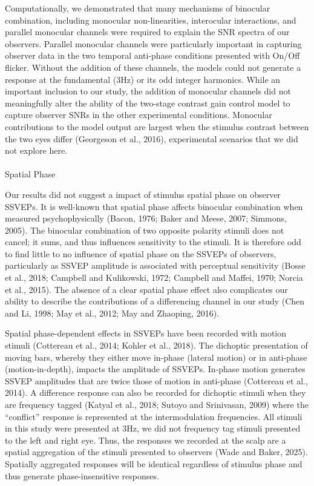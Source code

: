\documentclass[
  12pt,
]{article}
\makeatletter
\let\oldparagraph\paragraph
\renewcommand{\paragraph}{
    \@ifstar
      \xxxParagraphStar
      \xxxParagraphNoStar
  }
\newcommand{\xxxParagraphStar}[1]{\oldparagraph*{#1}\mbox{}}
\newcommand{\xxxParagraphNoStar}[1]{\oldparagraph{#1}\mbox{}}
\makeatother
\begin{document}
Computationally, we demonstrated that many mechanisms of binocular
combination, including monocular non-linearities, interocular
interactions, and parallel monocular channels were required to explain
the SNR spectra of our observers. Parallel monocular channels were
particularly important in capturing observer data in the two temporal
anti-phase conditions presented with On/Off flicker. Without the
addition of these channels, the models could not generate a response at
the fundamental (3Hz) or its odd integer harmonics. While an important
inclusion to our study, the addition of monocular channels did not
meaningfully alter the ability of the two-stage contrast gain control
model to capture observer SNRs in the other experimental conditions.
Monocular contributions to the model output are largest when the
stimulus contrast between the two eyes differ (Georgeson et al., 2016),
experimental scenarios that we did not explore here.

\paragraph{Spatial Phase}\label{spatial-phase}

Our results did not suggest a impact of stimulus spatial phase on
observer SSVEPs. It is well-known that spatial phase affects binocular
combination when measured psychophysically (Bacon, 1976; Baker and
Meese, 2007; Simmons, 2005). The binocular combination of two opposite
polarity stimuli does not cancel; it sums, and thus influences
sensitivity to the stimuli. It is therefore odd to find little to no
influence of spatial phase on the SSVEPs of observers, particularly as
SSVEP amplitude is associated with perceptual sensitivity (Bosse et al.,
2018; Campbell and Kulikowski, 1972; Campbell and Maffei, 1970; Norcia
et al., 2015). The absence of a clear spatial phase effect also
complicates our ability to describe the contributions of a differencing
channel in our study (Chen and Li, 1998; May et al., 2012; May and
Zhaoping, 2016).

Spatial phase-dependent effects in SSVEPs have been recorded with motion
stimuli (Cottereau et al., 2014; Kohler et al., 2018). The dichoptic
presentation of moving bars, whereby they either move in-phase (lateral
motion) or in anti-phase (motion-in-depth), impacts the amplitude of
SSVEPs. In-phase motion generates SSVEP amplitudes that are twice those
of motion in anti-phase (Cottereau et al., 2014). A difference response
can also be recorded for dichoptic stimuli when they are frequency
tagged (Katyal et al., 2018; Sutoyo and Srinivasan, 2009) where the
``conflict'' response is represented at the intermodulation frequencies.
All stimuli in this study were presented at 3Hz, we did not frequency
tag stimuli presented to the left and right eye. Thus, the responses we
recorded at the scalp are a spatial aggregation of the stimuli presented
to observers (Wade and Baker, 2025). Spatially aggregated responses will
be identical regardless of stimulus phase and thus generate
phase-insensitive responses.
\end{document}
